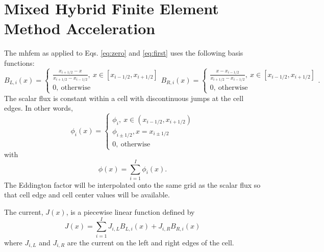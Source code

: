 
\newcommand{\bl}{B_{L,i}(x)}
\newcommand{\br}{B_{R,i}(x)}
\newcommand{\jil}{J_{i,L}}
\newcommand{\jir}{J_{i,R}}
\newcommand{\eddphi}[1]{\edd_{#1}\phi_{#1}}
\newcommand{\alphai}[2]{\frac{#1}{\Sigma_{t,#2}h_{#2}}}

\section{Mixed Hybrid Finite Element Method Acceleration}

The \gls{mhfem} as applied to Eqs. \ref{eq:zero} and \ref{eq:first} uses the following basis functions:
	\begin{subequations}
	\begin{equation} \label{mhfem:BL}
		\bl = \begin{cases}
			\frac{x_{i+1/2} - x}{x_{i+1/2} - x_{i-1/2}}, \ x \in [x_{i-1/2}, x_{i+1/2}] \\ 
			0, \ \text{otherwise}
		\end{cases}
	\end{equation}
	\begin{equation} \label{mhfem:BR}
		\br = \begin{cases}
			\frac{x - x_{i-1/2}}{x_{i+1/2} - x_{i-1/2}}, \ x \in [x_{i-1/2}, x_{i+1/2}] \\ 
			0, \ \text{otherwise}
		\end{cases}. 
	\end{equation}
	\end{subequations}
The scalar flux is constant within a cell with discontinuous jumps at the cell edges. In other words, 
	\begin{equation} \label{mhfem:flux}
		\phi_i(x) = \begin{cases}
			\phi_i, \ x \in (x_{i-1/2}, x_{i+1/2}) \\ 
			\phi_{i\pm 1/2}, x = x_{i\pm1/2} \\ 
			0, \ \text{otherwise}
		\end{cases} 
	\end{equation}
with 
	\begin{equation} \label{mhfem:sumphi}
		\phi(x) = \sum_{i=1}^I \phi_i(x). 
	\end{equation}
The Eddington factor will be interpolated onto the same grid as the scalar flux so that cell edge and cell center values will be available.  

The current, $J(x)$, is a piecewise linear function defined by 
	\begin{equation} \label{mhfem:J}
		J(x) = \sum_{i=1}^I \jil \bl + \jir \br
	\end{equation} 
where $\jil$ and $\jir$ are the current on the left and right edges of the cell. 

